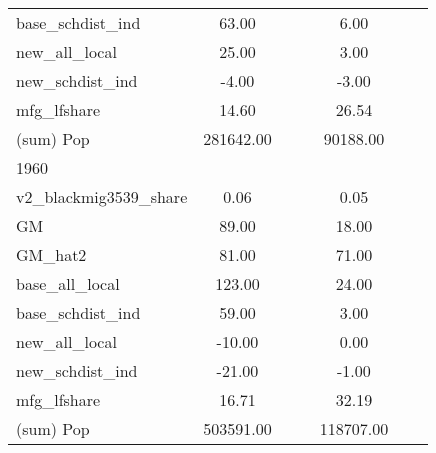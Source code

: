 \begin{table}[htbp]
\begin{tabular}{l*{2}{ccc}}
base\_schdist\_ind    &       63.00&            &            &        6.00&            &            \\
new\_all\_local       &       25.00&            &            &        3.00&            &            \\
new\_schdist\_ind     &       -4.00&            &            &       -3.00&            &            \\
mfg\_lfshare         &       14.60&            &            &       26.54&            &            \\
(sum) Pop           &   281642.00&            &            &    90188.00&            &            \\
\midrule
1960                &            &            &            &            &            &            \\
v2\_blackmig3539\_share&        0.06&            &            &        0.05&            &            \\
GM                  &       89.00&            &            &       18.00&            &            \\
GM\_hat2             &       81.00&            &            &       71.00&            &            \\
base\_all\_local      &      123.00&            &            &       24.00&            &            \\
base\_schdist\_ind    &       59.00&            &            &        3.00&            &            \\
new\_all\_local       &      -10.00&            &            &        0.00&            &            \\
new\_schdist\_ind     &      -21.00&            &            &       -1.00&            &            \\
mfg\_lfshare         &       16.71&            &            &       32.19&            &            \\
(sum) Pop           &   503591.00&            &            &   118707.00&            &            \\
\bottomrule
\end{tabular}
\end{table}
